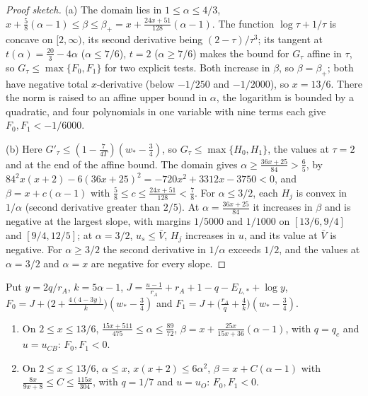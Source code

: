 \begin{proof}[Proof sketch]
(a) The domain lies in $1\le\alpha\le4/3$, $x+\frac58(\alpha-1)\le\beta\le\beta_+=
x+\frac{24x+51}{128}(\alpha-1)$. The function $\log\tau+1/\tau$ is concave on $[2,\infty)$, its
second derivative being $(2-\tau)/\tau^3$; its tangent at $t(\alpha)=\frac{20}3-4\alpha$
($\alpha\le7/6$), $t=2$ ($\alpha\ge7/6$) makes the bound for $G_\tau$ affine in $\tau$, so
$G_\tau\le\max\{F_0,F_1\}$ for two explicit tests. Both increase in $\beta$, so $\beta=\beta_+$;
both have negative total $x$-derivative (below $-1/250$ and $-1/2000$), so $x=13/6$. There the
norm is raised to an affine upper bound in $\alpha$, the logarithm is bounded by a quadratic, and
four polynomials in one variable with nine terms each give $F_0,F_1<-1/6000$.

(b) Here $G'_\tau\le(1-\frac{7}{4T})(w_*-\frac34)$, so $G_\tau\le\max\{H_0,H_1\}$, the values at
$\tau=2$ and at the end of the affine bound. The domain gives $\alpha\ge\frac{36x+25}{84}>\frac65$,
by $84^2x(x+2)-6(36x+25)^2=-720x^2+3312x-3750<0$, and $\beta=x+c(\alpha-1)$ with
$\frac58\le c\le\frac{24x+51}{128}<\frac78$. For $\alpha\le3/2$, each $H_j$ is convex in
$1/\alpha$ (second derivative greater than $2/5$). At $\alpha=\frac{36x+25}{84}$ it increases in
$\beta$ and is negative at the largest slope, with margins $1/5000$ and $1/1000$ on $[13/6,9/4]$
and $[9/4,12/5]$; at $\alpha=3/2$, $u_s\le\bar V$, $H_j$ increases in $u$, and its value at
$\bar V$ is negative. For $\alpha\ge3/2$ the second derivative in $1/\alpha$ exceeds $1/2$, and the
values at $\alpha=3/2$ and $\alpha=x$ are negative for every slope.
\end{proof}

\begin{proposition}\label{prop:ss-face-S3}
Put $y=2q/r_A$, $k=5\alpha-1$, $J=\frac{u-1}{r_A}+r_A+1-q-E_{L,*}+\log y$,
$F_0=J+\bigl(2+\frac{4(4-3y)}k\bigr)(w_*-\frac34)$ and $F_1=J+\bigl(\frac{r_A}q+\frac4k\bigr)
(w_*-\frac34)$.
\begin{enumerate}[label=(\alph*)]
\item On $2\le x\le13/6$, $\frac{15x+511}{475}\le\alpha\le\frac{89}{72}$,
  $\beta=x+\frac{25x}{15x+36}(\alpha-1)$, with $q=q_c$ and $u=u_{CB}$: $F_0,F_1<0$.
\item On $2\le x\le13/6$, $\alpha\le x$, $x(x+2)\le6\alpha^2$, $\beta=x+C(\alpha-1)$ with
  $\frac{8x}{9x+8}\le C\le\frac{115x}{304}$, with $q=1/7$ and $u=u_O$: $F_0,F_1<0$.
\end{enumerate}
\end{proposition}


